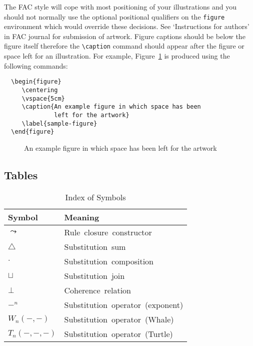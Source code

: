 The FAC style will cope with most positioning of your illustrations and you
should not normally use the optional positional qualifiers on the
\verb"figure" environment which would override these decisions.
See `Instructions for authors' in FAC journal for submission of artwork.
Figure captions should be below the figure itself therefore the
\verb"\caption"
command should appear after the figure or space left for an illustration.
For example, Figure~\ref{sample-figure} is produced using the following
commands:
%
\begin{verbatim}
  \begin{figure}
     \centering
     \vspace{5cm}
     \caption{An example figure in which space has been
              left for the artwork}
     \label{sample-figure}
  \end{figure}
\end{verbatim}
%
  \begin{figure}
     \centering
     \vspace{5cm}
     \caption{An example figure in which space has been
              left for the artwork}
     \label{sample-figure}
  \end{figure}

\subsection{Tables}
\begin{table}
  \caption{Index of Symbols}
  \begin{tabular}{ll}
   \hline
   Symbol\hspace{1cm}  & Meaning \\
   \hline
   $\leadsto$          & \hbox{Rule closure constructor} \\
   $\bigtriangleup$    & \hbox{Substitution sum} \\
   $\cdot$             & \hbox{Substitution composition} \\
   $\sqcup$            & \hbox{Substitution join} \\
   $\bot$              & \hbox{Coherence relation} \\
   $-^n$               & \hbox{Substitution operator
                                         (exponent)} \\
   $W_n(-,-)$          & \hbox{Substitution operator
                                         (Whale)} \\
   $T_n(-,-,-)$        & \hbox{Substitution operator
                                         (Turtle)} \\
   \hline
  \end{tabular}
  \label{symbols}
\end{table}

